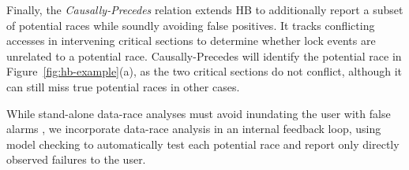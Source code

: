Finally, the {\em Causally-Precedes} relation \cite{predictive-dr} %
extends HB to additionally report a subset of potential races while soundly avoiding false positives.
It tracks conflicting accesses in intervening
critical sections to determine whether lock events are unrelated to a potential race.
Causally-Precedes will identify the potential race in Figure~\ref{fig:hb-example}(a), as the two critical sections do not conflict,
although it can still miss true potential races in other cases.

While stand-alone data-race analyses must avoid inundating the user with false alarms \cite{racerx},
we incorporate data-race analysis in an internal feedback loop,
using model checking to automatically test each potential race
and report only directly observed failures to the user.


